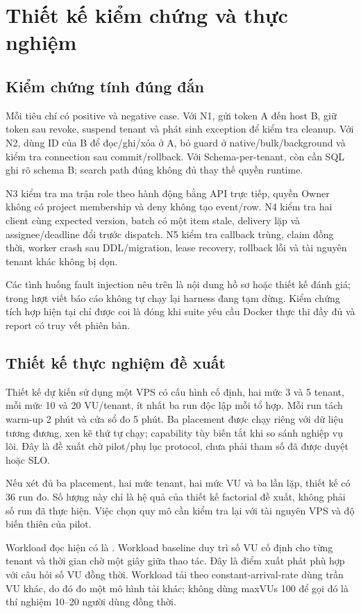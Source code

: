 \section{Thiết kế kiểm chứng và thực nghiệm}\label{sec:methods}
\subsection{Kiểm chứng tính đúng đắn}
Mỗi tiêu chí có positive và negative case. Với N1, gửi token A đến host B, giữ token sau revoke, suspend tenant và phát sinh exception để kiểm tra cleanup. Với N2, dùng ID của B để đọc\slash ghi\slash xóa ở A, bỏ guard ở native\slash bulk\slash background và kiểm tra connection sau commit\slash rollback. Với Schema-per-tenant, còn cần SQL ghi rõ schema B; search path đúng không đủ thay thế quyền runtime.

N3 kiểm tra ma trận role theo hành động bằng API trực tiếp, quyền Owner không có project membership và deny không tạo event\slash row. N4 kiểm tra hai client cùng expected version, batch có một item stale, delivery lặp và assignee\slash deadline đổi trước dispatch. N5 kiểm tra callback trùng, claim đồng thời, worker crash sau DDL\slash migration, lease recovery, rollback lỗi và tài nguyên tenant khác không bị dọn.

Các tình huống fault injection nêu trên là nội dung hồ sơ hoặc thiết kế đánh giá; trong lượt viết báo cáo không tự chạy lại harness đang tạm dừng. Kiểm chứng tích hợp hiện tại chỉ được coi là đóng khi suite yêu cầu Docker thực thi đầy đủ và report có truy vết phiên bản.

\subsection{Thiết kế thực nghiệm đề xuất}
Thiết kế dự kiến sử dụng một VPS có cấu hình cố định, hai mức 3 và 5 tenant, mỗi mức 10 và 20 VU\slash tenant, ít nhất ba run độc lập mỗi tổ hợp. Mỗi run tách warm-up 2 phút và cửa sổ đo 5 phút. Ba placement được chạy riêng với dữ liệu tương đương, xen kẽ thứ tự chạy; capability tùy biến tắt khi so sánh nghiệp vụ lõi. Đây là đề xuất chờ pilot\slash phụ lục protocol, chưa phải tham số đã được duyệt hoặc SLO.

Nếu xét đủ ba placement, hai mức tenant, hai mức VU và ba lần lặp, thiết kế có 36 run đo. Số lượng này chỉ là hệ quả của thiết kế factorial đề xuất, không phải số run đã thực hiện. Việc chọn quy mô cần kiểm tra lại với tài nguyên VPS và độ biến thiên của pilot.

Workload đọc hiện có là . Workload baseline duy trì số VU cố định cho từng tenant và thời gian chờ một giây giữa thao tác. Đây là điểm xuất phát phù hợp với câu hỏi số VU đồng thời. Workload tải theo constant-arrival-rate dùng trần VU khác, do đó đo một mô hình tải khác; không dùng maxVUs 100 để gọi đó là thí nghiệm 10--20 người dùng đồng thời.

